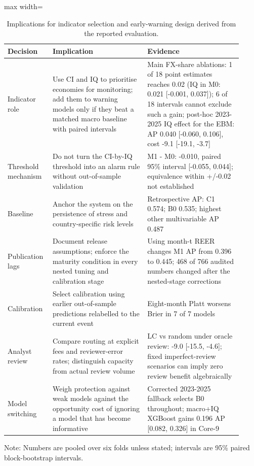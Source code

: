 \documentclass[preprint,12pt,authoryear]{elsarticle}
\begin{document}
\begin{table}[!htbp]
\centering
\scriptsize
\setlength{\tabcolsep}{3pt}
\caption{Implications for indicator selection and early-warning design derived from the reported evaluation.}
\label{tab:rules}
\begin{adjustbox}{max width=\textwidth}
\begin{tabular}{p{0.16\linewidth}p{0.38\linewidth}p{0.38\linewidth}}
\toprule
Decision & Implication & Evidence \\
\midrule
Indicator role & Use CI and IQ to prioritise economies for monitoring; add them to warning models only if they beat a matched macro baseline with paired intervals & Main FX-share ablations: 1 of 18 point estimates reaches 0.02 (IQ in M0: 0.021 [-0.001, 0.037]); 6 of 18 intervals cannot exclude such a gain; post-hoc 2023-2025 IQ effect for the EBM: AP 0.040 [-0.060, 0.106], cost -9.1 [-19.1, -3.7] \\
Threshold mechanism & Do not turn the CI-by-IQ threshold into an alarm rule without out-of-sample validation & M1 - M0: -0.010, paired 95\% interval [-0.055, 0.044]; equivalence within +/-0.02 not established \\
Baseline & Anchor the system on the persistence of stress and country-specific risk levels & Retrospective AP: C1 0.574; B0 0.535; highest other multivariable AP 0.487 \\
Publication lags & Document release assumptions; enforce the maturity condition in every nested tuning and calibration stage & Using month-t REER changes M1 AP from 0.396 to 0.445; 468 of 766 audited numbers changed after the nested-stage corrections \\
Calibration & Select calibration using earlier out-of-sample predictions relabelled to the current event & Eight-month Platt worsens Brier in 7 of 7 models \\
Analyst review & Compare routing at explicit fees and reviewer-error rates; distinguish capacity from actual review volume & LC vs random under oracle review: -9.0 [-15.5, -4.6]; fixed imperfect-review scenarios can imply zero review benefit algebraically \\
Model switching & Weigh protection against weak models against the opportunity cost of ignoring a model that has become informative & Corrected 2023-2025 fallback selects B0 throughout; macro+IQ XGBoost gains 0.196 AP [0.082, 0.326] in Core-9 \\
\bottomrule
\end{tabular}
\end{adjustbox}
\par\vspace{2pt}\parbox{0.95\linewidth}{\scriptsize Note: Numbers are pooled over six folds unless stated; intervals are 95\% paired block-bootstrap intervals.}
\end{table}
\end{document}
